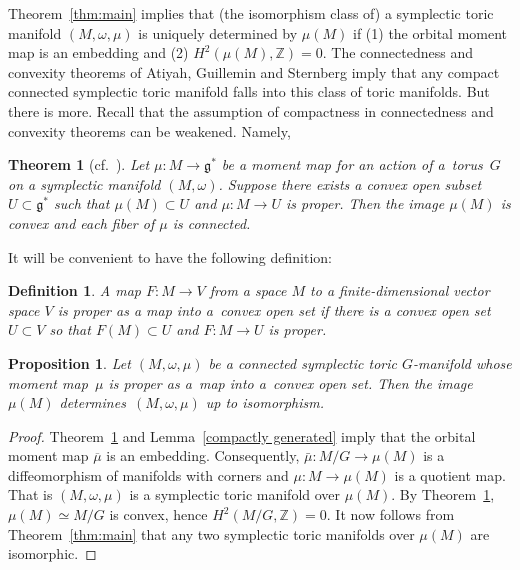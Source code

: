 \documentclass[10pt,a4paper]{amsart}
\numberwithin{equation}{section}
\newtheorem{Theorem}[Lemma]{Theorem}
\newtheorem{Proposition}[Lemma]{Proposition}
\newtheorem{Definition}[Lemma]{Definition}
\begin{document}
Theorem~\ref{thm:main} implies that (the isomorphism
class of) a symplectic toric manifold $(M,\omega, \mu)$ is uniquely
determined by $\mu(M)$ if (1) the orbital moment map is an
embedding and (2) $H^2(\mu(M),{\mathbb Z}) =0$.  The connectedness and
convexity theorems of Atiyah, Guillemin and Sternberg imply that any
compact connected symplectic toric manifold falls into this class of
toric manifolds. But there is more.  Recall that the assumption of
compactness in connectedness and convexity theorems can be weakened.
Namely,

\begin{Theorem}[cf.\ ]\label{thm:LMTW}
    Let $\mu\colon M\to {\mathfrak g}^*$ be a moment map for an action of a~torus~$G$
    on a symplectic manifold $(M,\omega)$.  Suppose there exists a
    convex open subset $U\subset {\mathfrak g}^*$ such that $\mu(M)\subset U$ and
    $\mu\colon M\to U$ is proper.  Then the image $\mu(M)$ is convex and
    each fiber of $\mu$ is connected.
\end{Theorem}

It will be convenient to have the following def\/inition:

\begin{Definition}
  A map $F\colon M\to V$ from a space $M$ to a f\/inite-dimensional vector
  space $V$ is {\em proper as a map into a~convex open set} if
  there is a convex open set $U\subset V$ so that $F(M)\subset U$ and
  $F\colon M\to U$ is proper.
\end{Definition}

\begin{Proposition} \label{Delzant over subset}
Let $(M,\omega,\mu)$ be a connected symplectic toric $G$-manifold
whose moment map~$\mu$ is proper as a~map into a~convex open set.
Then the image~$\mu(M)$ determines~$(M,\omega,\mu)$ up to isomorphism.
\end{Proposition}

\begin{proof}
  Theorem~\ref{thm:LMTW} and Lemma~\ref{compactly generated}
  imply that the orbital moment map $\overline{\mu}$ is an embedding.
  Consequently, $\bar{\mu}\colon M/G\to \mu(M)$ is a dif\/feomorphism
  of manifolds with corners and \mbox{$\mu\colon M\to \mu(M)$} is a quotient map.
  That is $(M,\omega, \mu)$ is a symplectic toric manifold over
  $\mu(M)$.  By Theorem~\ref{thm:LMTW}, $\mu(M) \simeq M/G$ is
  convex, hence $H^2(M/G,{\mathbb Z}) = 0$.  It now follows from
  Theorem~\ref{thm:main} that any two symplectic toric manifolds over
  $\mu(M)$ are isomorphic.
\end{proof}
\end{document}
